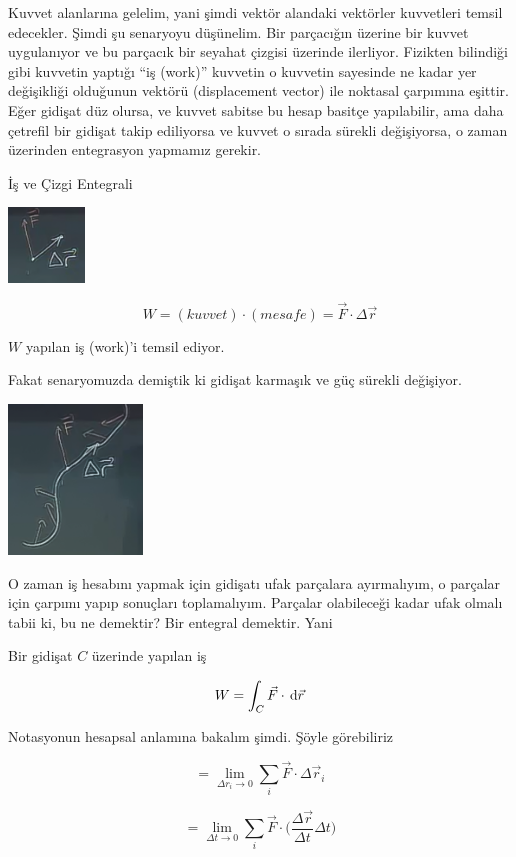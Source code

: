 \documentclass[12pt,fleqn]{article}\usepackage{../../common}
\begin{document}
Kuvvet alanlarına gelelim, yani şimdi vektör alandaki vektörler kuvvetleri
temsil edecekler. Şimdi şu senaryoyu düşünelim. Bir parçacığın üzerine bir
kuvvet uygulanıyor ve bu parçacık bir seyahat çizgisi üzerinde
ilerliyor. Fizikten bilindiği gibi kuvvetin yaptığı ``iş (work)'' kuvvetin
o kuvvetin sayesinde ne kadar yer değişikliği olduğunun vektörü
(displacement vector) ile noktasal çarpımına eşittir. Eğer gidişat düz
olursa, ve kuvvet sabitse bu hesap basitçe yapılabilir, ama daha çetrefil
bir gidişat takip ediliyorsa ve kuvvet o sırada sürekli değişiyorsa, o
zaman üzerinden entegrasyon yapmamız gerekir.

İş ve Çizgi Entegrali

\includegraphics[height=2cm]{19_8.png}

$$ W = (kuvvet)\cdot(mesafe) = \vec{F}\cdot\Delta\vec{r} $$

$W$ yapılan iş (work)'i temsil ediyor. 

Fakat senaryomuzda demiştik ki gidişat karmaşık ve güç sürekli
değişiyor.

\includegraphics[height=4cm]{19_9.png}

O zaman iş hesabını yapmak için gidişatı ufak parçalara ayırmalıyım, o
parçalar için çarpımı yapıp sonuçları toplamalıyım. Parçalar olabileceği
kadar ufak olmalı tabii ki, bu ne demektir? Bir entegral demektir. Yani

Bir gidişat $C$ üzerinde yapılan iş 

$$ W = \int_C \vec{F} \cdot \,\mathrm{d}\vec{r} $$

Notasyonun hesapsal anlamına bakalım şimdi. Şöyle görebiliriz

$$ = \lim_{\Delta r_i \to 0} \sum_i  \vec{F} \cdot \Delta\vec{r}_i$$

$$ = 
\lim_{\Delta t \to 0} \sum_i  
\vec{F} \cdot \bigg( \frac{\Delta\vec{r}}{\Delta t} \Delta t 
\bigg)
$$
\end{document}
